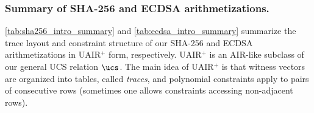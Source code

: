 
\subsubsection{Summary of SHA-256 and ECDSA arithmetizations.} 

\cref{tab:sha256_intro_summary} and \cref{tab:ecdsa_intro_summary} summarize the trace layout and  constraint structure of our SHA-256 and ECDSA arithmetizations in UAIR${}^+$ form, respectively. UAIR${}^+$ is an AIR-like subclass of our general UCS relation $\ucs$. The main idea of UAIR${}^+$ is that witness vectors are organized into tables, called \emph{traces}, and polynomial constraints apply to pairs of consecutive rows (sometimes one allows constraints accessing non-adjacent rows). 

